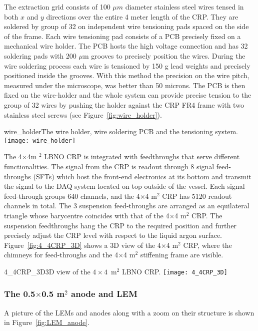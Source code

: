  The extraction grid consists of 100 $\mu$$m$ diameter stainless steel  wires tensed in both $x$ and $y$ directions over the entire 4 meter
 length of the CRP. They are soldered by group of 32 on independent  wire tensioning pads spaced on the side of the frame. Each wire
 tensioning pad consists of a PCB precisely fixed on a mechanical wire  holder. The PCB hosts the high voltage connection and has 32
 soldering pads with 200 $\mu$m grooves to precisely position the  wires. During the wire soldering process each wire is tensioned by
 150 g lead weights and precisely positioned inside the grooves. With  this method the precision on the wire pitch, measured under the
 microscope, was better than 50 microns. The PCB is then fixed on the  wire-holder and the whole system can provide precise tension to the
 group of 32 wires by pushing the holder against the CRP FR4 frame  with two stainless steel screws (see Figure~\ref{fig:wire_holder}).

\begin{cdrfigure}{wire_holder}{The wire holder, wire soldering PCB and the tensioning system.}
\texttt{[image: wire\_holder]}  
\end{cdrfigure}

The 4$\times$4m $^2$ LBNO CRP is integrated with feedthroughs that serve  different functionalities. The signal from the CRP is readout
through 8 signal feed-throughs (SFTs) which host the front-end electronics at its bottom and transmit the signal to the DAQ system
located on top outside of the vessel.  Each signal feed-through groups 640 channels, and the 4$\times$4 m$^2$ CRP has 5120 readout
channels in total.  The 3 suspension feed-throughs are arranged as an equilateral triangle whose barycentre coincides with that of the 4$\times$4 m$^2$ CRP.  The suspension feedthroughs hang the CRP to   the required position and further precisely adjust the CRP level  with respect to the liquid argon
surface. Figure~\ref{fig:4_4CRP_3D} shows a 3D view of the  4$\times$4 m$^2$ CRP, where the chimneys for feed-throughs and the  4$\times$4 m$^2$ stiffening frame are visible.
 

\begin{cdrfigure}{4_4CRP_3D}{3D view of the $4\times4$~m$^2$ LBNO CRP.}
\texttt{[image: 4\_4CRP\_3D]}  
\end{cdrfigure}


 \subsubsection{The 0.5$\times$0.5 m$^2$ anode and LEM}
 A picture of the LEMs and anodes along with a zoom on
 their structure is shown in Figure~\ref{fig:LEM_anode}.


